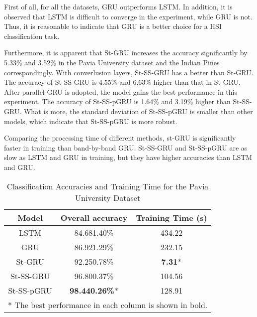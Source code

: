 \documentclass[conference]{IEEEtran}
\begin{document}
First of all, for all the datasets, GRU outperforms LSTM. In addition, it is observed
that LSTM is difficult to converge in the experiment, while GRU is not. Thus, it is
reasonable to indicate that GRU is a better choice for a HSI classification task.

Furthermore, it is apparent that St-GRU increases the accuracy significantly by 5.33\%
and 3.52\% in the Pavia University dataset and the Indian Pines correspondingly. With
converlusion layers, St-SS-GRU has a better than St-GRU. The accuracy of St-SS-GRU is
4.55\% and 6.63\% higher than that in St-GRU. After parallel-GRU is adopted, the model
gains the best performance in this experiment. The accuracy of St-SS-pGRU is 1.64\%
and 3.19\% higher than St-SS-GRU. What is more, the standard deviation of St-SS-pGRU
is smaller than other models, which indicate that St-SS-pGRU is more robust. 

Comparing the processing time of different methods, st-GRU is significantly faster
in training than band-by-band GRU. St-SS-GRU and St-SS-pGRU are as slow as LSTM and
GRU in training, but they have higher accuracies than LSTM and GRU.



\begin{table}[htbp]
    \caption{Classification Accuracies and Training Time for the Pavia University Dataset}
    \begin{center}
    \begin{tabular}{c|cc}
    \hline
    \hline
    \textbf{Model} & \textbf{Overall accuracy} & \textbf{Training Time (s)} \\
    \hline
    LSTM           & 84.681.40\%               & 434.22                    \\
    GRU            & 86.921.29\%               & 232.15                    \\
    St-GRU         & 92.250.78\%               & \textbf{7.31}*            \\
    St-SS-GRU      & 96.800.37\%               & 104.56                     \\
    St-SS-pGRU     & \textbf{98.440.26\%}*     & 128.91                     \\
    \hline
    \hline
    \multicolumn{3}{l}{* The best performance in each column is shown in bold.}\\
    \end{tabular}
    \end{center}
    \label{tab:puaac}
    \end{table}
    
\end{document}
